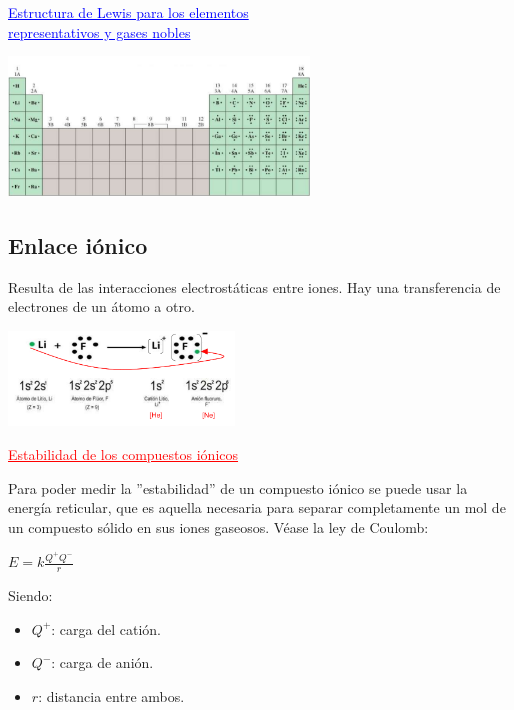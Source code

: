         \begin{center} \textcolor{blue}{\underline{Estructura de Lewis para los elementos } \\ \underline{representativos y gases nobles}} \end{center}
        \begin{center} \includegraphics[width=8cm]{./imagenes/estructuraLewisElementosReprenYGasesNobles.png} \end{center}

    \subsection{Enlace iónico}
        \sangria{} Resulta de las interacciones electrostáticas entre iones. Hay una transferencia de electrones de un átomo a otro.
        \begin{center} \includegraphics[width=6cm]{./imagenes/ejemploEnlaceIonico.png} \end{center} \columnbreak{}

        \begin{center} \textcolor{red}{\underline{Estabilidad de los compuestos iónicos}} \end{center}

        \sangria{} Para poder medir la ''estabilidad'' de un compuesto iónico se puede usar la energía reticular, que es aquella necesaria para separar completamente un mol de un compuesto sólido en sus iones gaseosos. Véase la ley de Coulomb:

        \begin{center} $E = k\frac{Q^+Q^-}{r}$ \end{center}

        \sangria{} Siendo:
        \begin{itemize} 
            \item $Q^+$: carga del catión.
            \item $Q^-$: carga de anión.
            \item $r$: distancia entre ambos.
        \end{itemize}

